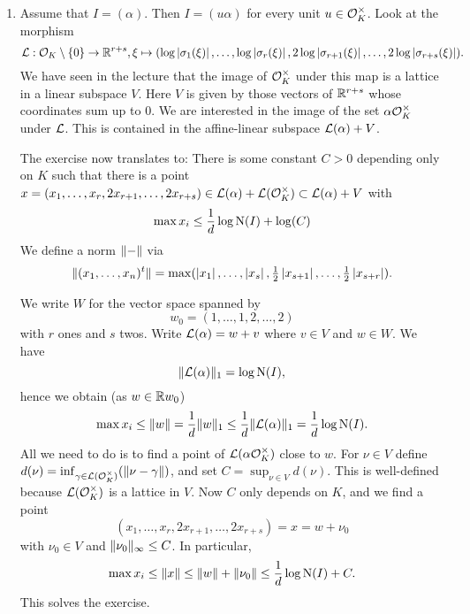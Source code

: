 \documentclass[a4paper,11pt]{article}
\begin{document}
\begin{enumerate}[wide, labelindent=0pt]
    \item Assume that $I = (\alpha)$.
        Then $I = (u \alpha)$ for every unit $u \in \mathcal{O}_K^\times$. Look at the morphism
        \begin{equation*}
            \mathcal{L}: \mathcal{O}_K\setminus \{0\} \to \mathbb{R}^{r+s}, 
            \xi \mapsto (\log \left\lvert \sigma_1(\xi) \right\rvert, \dots, \log \left\lvert \sigma_r(\xi) \right\rvert, 
            2\log \left\lvert \sigma_{r+1}(\xi) \right\rvert, \dots, 2 \log \left\lvert \sigma_{r+s}(\xi) \right\rvert).
        \end{equation*}
        We have seen in the lecture that the image of $\mathcal{O}_K^\times$ under this map 
        is a lattice in a linear subspace $V$. Here $V$ is given by those vectors
        of $\mathbb{R}^{r+s}$ whose coordinates sum up to $0$. We are interested
        in the image of the set $\alpha \mathcal{O}_K^\times$ under $\mathcal{L}$. This is contained
        in the affine-linear subspace $\mathcal{L}(\alpha) + V$. 
        
        The exercise now translates to: There is some constant $C > 0$ depending only
        on $K$ such that there is a point $x = (x_1, \dots, x_r, 2x_{r+1}, \dots,
        2x_{r+s}) \in \mathcal{L}(\alpha) + \mathcal{L}(\mathcal{O}_K^\times) \subset \mathcal{L}(\alpha)+V$ with 
        \begin{equation*}
             \max x_i \leq \frac 1d \log \operatorname{N}(I) + \log(C)
        \end{equation*}
        We define a norm $\lVert-\rVert$ via 
        \begin{equation*}
            \lVert(x_1, \dots, x_n)^t \rVert = \max (\left\lvert x_1 \right\rvert, \dots, \left\lvert x_s \right\rvert,
            \tfrac 12 \left\lvert x_{s+1} \right\rvert, \dots, \tfrac 12 \left\lvert x_{s+r} \right\rvert).
        \end{equation*}

        We write $W$ for the vector space spanned by 
        \begin{equation*}
            w_0 =  (1,\dots,1,2, \dots, 2)
        \end{equation*}
        with $r$ ones and $s$ twos.
        Write $\mathcal{L}(\alpha) = w + v$ where
        $v \in V$ and $w \in W$. We have 
        \begin{equation*}
            \lVert\mathcal{L}(\alpha)\rVert_1 = \log \operatorname{N}(I),
        \end{equation*}
        hence we obtain (as $w \in \mathbb{R} w_0$)
        $$\max x_i \leq \lVert w\rVert = \frac 1{d} \lVert w\rVert_1 \leq \frac 1d
        \lVert\mathcal{L}(\alpha)\rVert_1 = \frac 1d \log \operatorname{N}(I).$$
        All we need to do is to find a point of $\mathcal{L}(\alpha \mathcal{O}_K^\times)$
        close to $w$. For $\nu \in V$ define $d(\nu) = \inf_{\gamma \in \mathcal{L}(\mathcal{O}_K^\times)}
        (\lVert\nu-\gamma\rVert)$, and set $C = \sup_{\nu \in V} d(\nu)$. This 
        is well-defined because $\mathcal{L}(\mathcal{O}_K^\times)$ is a lattice in $V$.
        Now $C$ only depends on $K$, and we find a point 
        $$(x_1,\dots, x_r, 2x_{r+1},\dots, 2x_{r+s}) = x = w + \nu_0$$
        with $\nu_0 \in V$ and $\lVert\nu_0\rVert_\infty \leq C$. In particular,
        \begin{equation*}
        \max x_i \leq \lVert x\rVert \leq \lVert w\rVert + \lVert\nu_0\rVert \leq
        \frac 1d \log \operatorname{N}(I) + C.
        \end{equation*}
        This solves the exercise.
        

\end{enumerate}
\end{document}
